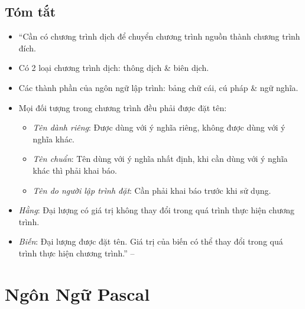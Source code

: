 \documentclass[oneside]{book}
\numberwithin{equation}{section}
\begin{document}
\subsection{Tóm tắt}
\begin{itemize}
	\item ``Cần có chương trình dịch để chuyển chương trình nguồn thành chương trình đích.
	\item Có 2 loại chương trình dịch: thông dịch \& biên dịch.
	\item Các thành phần của ngôn ngữ lập trình: bảng chữ cái, cú pháp \& ngữ nghĩa.
	\item Mọi đối tượng trong chương trình đều phải được đặt tên:
	\begin{itemize}
		\item \textit{Tên dành riêng}: Được dùng với ý nghĩa riêng, không được dùng với ý nghĩa khác.
		\item \textit{Tên chuẩn}: Tên dùng với ý nghĩa nhất định, khi cần dùng với ý nghĩa khác thì phải khai báo.
		\item \textit{Tên do người lập trình đặt}: Cần phải khai báo trước khi sử dụng.
	\end{itemize}
	\item \textit{Hằng}: Đại lượng có giá trị không thay đổi trong quá trình thực hiện chương trình.
	\item \textit{Biến}: Đại lượng được đặt tên. Giá trị của biến có thể thay đổi trong quá trình thực hiện chương trình.'' -- \cite[p. 13]{SGK_Tin_Hoc_11}
\end{itemize}


\section{Ngôn Ngữ Pascal}
\end{document}
